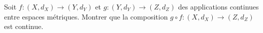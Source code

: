 
\begin{exercice}\label{exo0084}

Soit $f \colon (X,d_X) \to (Y,d_Y)$ et $g \colon (Y,d_Y) \to (Z,d_Z)$ des applications continues entre espaces métriques.  Montrer que la composition $g \circ f \colon (X,d_X) \to (Z,d_Z)$ est continue.

\end{exercice}
